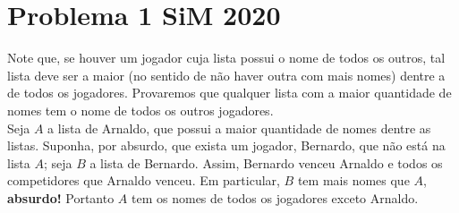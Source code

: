 \section{Problema 1 SiM 2020}

Note que, se houver um jogador cuja lista possui o nome de todos os outros, tal lista deve ser a maior (no sentido de não haver outra com mais nomes) dentre a de todos os jogadores. Provaremos que qualquer lista com a maior quantidade de nomes tem o nome de todos os outros jogadores.\\

Seja $A$ a lista de Arnaldo, que possui a maior quantidade de nomes dentre as listas. Suponha, por absurdo, que exista um jogador, Bernardo, que não está na lista $A$; seja $B$ a lista de Bernardo. Assim, Bernardo venceu Arnaldo e todos os competidores que Arnaldo venceu. Em particular, $B$ tem mais nomes que $A$, \textbf{absurdo!} Portanto $A$ tem os nomes de todos os jogadores exceto Arnaldo.